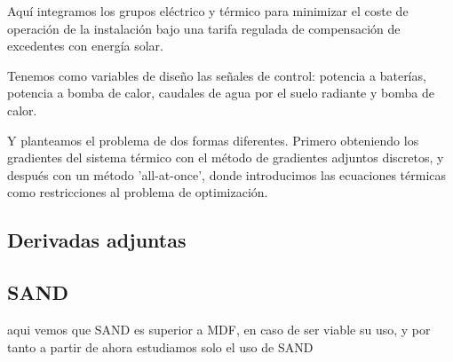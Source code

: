 Aquí integramos los grupos eléctrico y térmico para minimizar el coste de
operación de la instalación bajo una tarifa regulada de compensación de
excedentes con energía solar.

Tenemos como variables de diseño las señales de control: potencia a baterías,
potencia a bomba de calor, caudales de agua por el suelo radiante y bomba de
calor.

Y planteamos el problema de dos formas diferentes. Primero obteniendo los
gradientes del sistema térmico con el método de gradientes adjuntos discretos,
y después con un método 'all-at-once', donde introducimos las ecuaciones
térmicas como restricciones al problema de optimización.


\subsection{Derivadas adjuntas}

\subsection{SAND}

aqui vemos que SAND es superior a MDF, en caso de ser viable su uso,
y por tanto a partir de ahora estudiamos solo el uso de SAND
